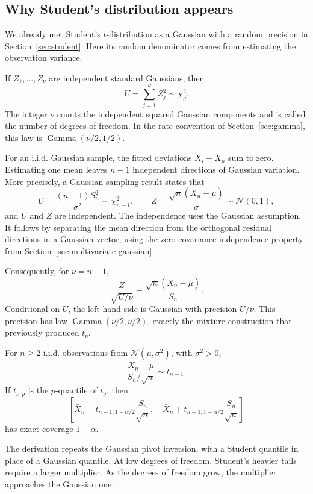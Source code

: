 \subsection{Why Student's distribution appears}

We already met Student's \(t\)-distribution as a Gaussian with a random
precision in Section~\ref{sec:student}. Here its random denominator
comes from estimating the observation variance.

\begin{definition}
If \(Z_1,\ldots,Z_\nu\) are independent standard Gaussians, then
\[
  U=\sum_{j=1}^{\nu}Z_j^2\sim\chi^2_\nu.
\]
The integer \(\nu\) counts the independent squared Gaussian components
and is called the number of degrees of freedom. In the rate convention
of Section~\ref{sec:gamma}, this law is
\(\operatorname{Gamma}(\nu/2,1/2)\).
\end{definition}

For an i.i.d. Gaussian sample, the fitted deviations
\(X_i-\bar X_n\) sum to zero. Estimating one mean leaves \(n-1\)
independent directions of Gaussian variation. More precisely, a Gaussian
sampling result states that
\[
  U=\frac{(n-1)S_n^2}{\sigma^2}\sim\chi^2_{n-1},
  \qquad
  Z=\frac{\sqrt n(\bar X_n-\mu)}{\sigma}\sim\mathcal N(0,1),
\]
and \(U\) and \(Z\) are independent. The independence uses the Gaussian
assumption. It follows by separating the mean direction from the
orthogonal residual directions in a Gaussian vector, using the
zero-covariance independence property from
Section~\ref{sec:multivariate-gaussian}.

Consequently, for \(\nu=n-1\),
\[
  \frac{Z}{\sqrt{U/\nu}}
  =\frac{\sqrt n(\bar X_n-\mu)}{S_n}.
\]
Conditional on \(U\), the left-hand side is Gaussian with precision
\(U/\nu\). This precision has law
\(\operatorname{Gamma}(\nu/2,\nu/2)\), exactly the mixture construction
that previously produced \(t_\nu\).

\begin{theorem}
For \(n\ge2\) i.i.d. observations from
\(\mathcal N(\mu,\sigma^2)\), with \(\sigma^2>0\),
\[
  \frac{\bar X_n-\mu}{S_n/\sqrt n}\sim t_{n-1}.
\]
If \(t_{\nu,p}\) is the \(p\)-quantile of \(t_\nu\), then
\[
  \left[\bar X_n-t_{n-1,1-\alpha/2}\frac{S_n}{\sqrt n},\quad
        \bar X_n+t_{n-1,1-\alpha/2}\frac{S_n}{\sqrt n}\right]
\]
has exact coverage \(1-\alpha\).
\end{theorem}

The derivation repeats the Gaussian pivot inversion, with a Student
quantile in place of a Gaussian quantile. At low degrees of freedom,
Student's heavier tails require a larger multiplier. As the degrees
of freedom grow, the multiplier approaches the Gaussian one.

